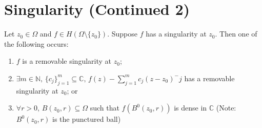 \documentclass[11pt, oneside]{book}
\begin{document}
\section{Singularity (Continued 2)} %
\label{sec:singularity_continued_2}

\begin{thm}\label{thm:casorati_weierstrass}
	Let $z_0 \in \Omega$ and $f \in H(\Omega \setminus \{z_0\})$. Suppose $f$ has a singularity at $z_0$. Then one of the following occurs:
	\begin{enumerate}
		\item $f$ is a removable singularity at $z_0$;
		\item $\exists m \in \mathbb{N}, \, \{c_j\}_{j = 1}^m \subseteq \mathbb{C}, \, f(z) - \sum_{j=1}^{m} c_j (z - z_0)^-j$ has a removable singularity at $z_0$; or
		\item $\forall r > 0, \, B(z_0, r) \subseteq \Omega$ such that $f(B^0(z_0, r))$ is dense in $\mathbb{C}$ (Note: $B^0(z_0, r)$ is the punctured ball)
	\end{enumerate}
\end{thm}
\end{document}
